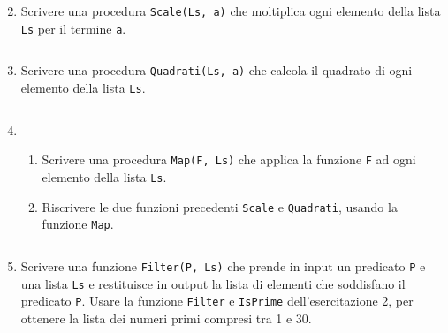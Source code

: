 \documentclass[11pt,a4]{article}
\newcommand{\mybox}[2]{$\quad$\fbox{
\begin{minipage}{#1cm}
\hfill\vspace{#2cm}
\end{minipage}
}}
\begin{document}
\begin{enumerate}
\mybox{15}{2.5}

\item Scrivere una procedura {\tt Scale(Ls, a)} che moltiplica ogni elemento della lista {\tt Ls} per il termine {\tt a}.

\mybox{15}{1.5}

\item Scrivere una procedura {\tt Quadrati(Ls, a)} che calcola il quadrato di ogni elemento della lista {\tt Ls}.

\mybox{15}{1.5}

\item 
\begin{enumerate}
\item Scrivere una procedura {\tt Map(F, Ls)} che applica la funzione {\tt F} ad ogni elemento della lista {\tt Ls}.
\item Riscrivere le due funzioni precedenti {\tt Scale} e {\tt Quadrati}, usando la funzione {\tt Map}.
\end{enumerate}

\mybox{15}{2.5}

\item Scrivere una funzione {\tt Filter(P, Ls)} che prende in input un predicato {\tt P} e una lista {\tt Ls}
e restituisce in output la lista di elementi che soddisfano il predicato {\tt P}. Usare la funzione {\tt Filter}
e {\tt IsPrime} dell'esercitazione 2, per ottenere la lista dei numeri primi compresi tra 1 e 30.


\mybox{15}{2.5}

\end{enumerate}
\end{document}
